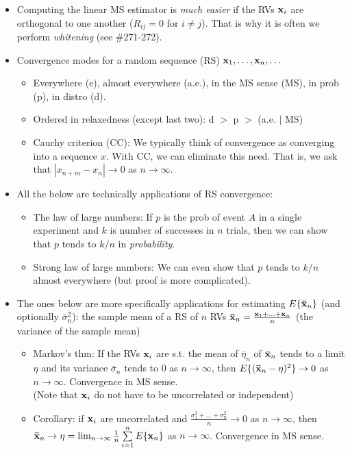 \documentclass[a4paper, oneside]{book}
\begin{document}
\begin{itemize}
\item Computing the linear MS estimator is \textit{much easier} if the RVs $\mathbf{x}_i$ are orthogonal to one another (\ie $R_{ij}=0$ for $i\neq j$).  That is why it is often we perform \textit{whitening} (see \#271-272).
\item Convergence modes for a random sequence (RS) $\mathbf{x}_1, \hdots, \mathbf{x}_n, \hdots$
\begin{itemize}
\item Everywhere (e), almost everywhere (a.e.), in the MS sense (MS), in prob (p), in distro (d).
\item Ordered in relaxedness (except last two): d $>$ p $>$ (a.e. $|$ MS)
\item Cauchy criterion (CC): We typically think of convergence as converging into a sequence $x$. With CC, we can eliminate this need. That is, we ask that $|x_{n+m}-x_n|\to	0$ as $n\to	\infty$.
\end{itemize}
\item All the below are technically applications of RS convergence:
	\begin{itemize}
	\item The law of large numbers: If $p$ is the prob of event $A$ in a single experiment and $k$ is number of successes in $n$ trials, then we can show that $p$ tends to $k/n$ in \textit{probability}.
	\item Strong law of large numbers: We can even show that $p$ tends to $k/n$ almost everywhere (but proof is more complicated).
	\end{itemize}
	\item The ones below are more specifically applications for estimating $E\{\mathbf{\bar{x}}_n\}$ (and optionally $\bar{\sigma}^2_n$): the sample mean of a RS of $n$ RVs $\mathbf{\bar{x}}_n=\frac{\mathbf{x}_1+\hdots+\mathbf{x}_n}{n}$ (the variance of the sample mean)
	\begin{itemize}
	\item Markov's thm: If the RVs $\mathbf{x}_i$ are s.t. the mean of $\bar{\eta}_n$ of $\bar{\mathbf{x}}_n$ tends to a limit $\eta$ and its variance $\bar{\sigma}_n$ tends to $0$ as $n\to \infty$, then $E\{(\mathbf{\bar{x}}_n-\eta)^2\}\to 0$ as $n\to \infty$. Convergence in MS sense.\\
	(Note that $\mathbf{x}_i$ do not have to be uncorrelated or independent)
	\item Corollary: if $\mathbf{x}_i$ are uncorrelated and $\frac{\sigma_1^2+\hdots+\sigma_n^2}{n}\to 0$ as $n\to \infty$, then $\mathbf{\bar{x}}_n\to \eta=\lim_{n\to\infty} \frac{1}{n}\sum\limits_{i=1}^n E\{\mathbf{x}_n\}$ as $n\to \infty$. Convergence in MS sense. \\

\end{itemize}
\end{itemize}
\end{document}
